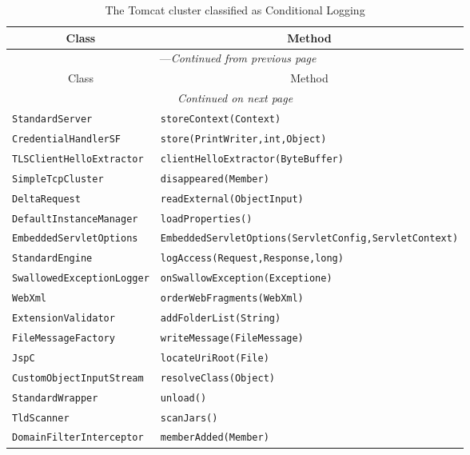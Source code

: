 \begin{center}
\begin{longtable}{ll}
\caption{The Tomcat cluster classified as Conditional Logging}\\
\toprule\multicolumn{1}{c}{Class}&\multicolumn{1}{c}{Method}\\\midrule
\endfirsthead

\multicolumn{2}{c}{\tablename\ \thetable{}---\textit{Continued from previous page}} \\\midrule
\multicolumn{1}{c}{Class}&\multicolumn{1}{c}{Method}\\\midrule
\endhead
\multicolumn{2}{c}{\textit{Continued on next page}}\\\midrule
\endfoot
\bottomrule
\endlastfoot
 \lstinline/StandardServer/&{\lstinline/storeContext(Context)/}\\
 \lstinline/CredentialHandlerSF/&{\lstinline/store(PrintWriter,int,Object)/}\\
 \lstinline/TLSClientHelloExtractor/&{\lstinline/clientHelloExtractor(ByteBuffer)/}\\
 \lstinline/SimpleTcpCluster/&{\lstinline/disappeared(Member)/}\\
 \lstinline/DeltaRequest/&{\lstinline/readExternal(ObjectInput)/}\\
 \lstinline/DefaultInstanceManager/&{\lstinline/loadProperties()/}\\
 \lstinline/EmbeddedServletOptions/&{\lstinline/EmbeddedServletOptions(ServletConfig,ServletContext)/}\\
 \lstinline/StandardEngine/&{\lstinline/logAccess(Request,Response,long)/}\\
 \lstinline/SwallowedExceptionLogger/&{\lstinline/onSwallowException(Exceptione)/}\\
 \lstinline/WebXml/&{\lstinline/orderWebFragments(WebXml)/}\\
 \lstinline/ExtensionValidator/&{\lstinline/addFolderList(String)/}\\
 \lstinline/FileMessageFactory/&{\lstinline/writeMessage(FileMessage)/}\\
 \lstinline/JspC/&{\lstinline/locateUriRoot(File)/}\\
 \lstinline/CustomObjectInputStream/&{\lstinline/resolveClass(Object)/}\\
 \lstinline/StandardWrapper/&{\lstinline/unload()/}\\
 \lstinline/TldScanner/&{\lstinline/scanJars()/}\\
 \lstinline/DomainFilterInterceptor/&{\lstinline/memberAdded(Member)/}\\

\end{longtable}
\end{center}
